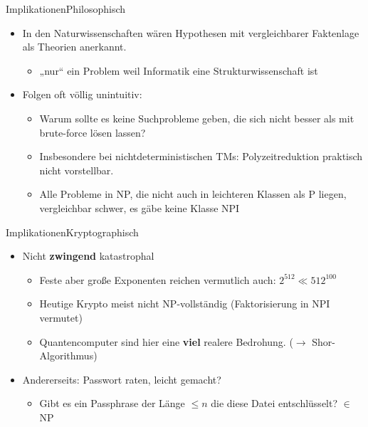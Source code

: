 \documentclass[ignorenonframetext,]{beamer}
\begin{document}
\begin{frame}{Implikationen}{Philosophisch}

\begin{itemize}
\itemsep1pt\parskip0pt
\item
  In den Naturwissenschaften wären Hypothesen mit vergleichbarer
  Faktenlage als Theorien anerkannt.

  \begin{itemize}
  \itemsep1pt\parskip0pt
  \item
    „nur`` ein Problem weil Informatik eine Strukturwissenschaft ist
  \end{itemize}
\item
  Folgen oft völlig unintuitiv:

  \begin{itemize}
  \itemsep1pt\parskip0pt
  \item
    Warum sollte es keine Suchprobleme geben, die sich nicht besser als
    mit brute-force lösen lassen?
  \item
    Insbesondere bei nichtdeterministischen TMs: Polyzeitreduktion
    praktisch nicht vorstellbar.
  \item
    Alle Probleme in NP, die nicht auch in leichteren Klassen als P liegen, vergleichbar
    schwer, es gäbe keine Klasse NPI
  \end{itemize}
\end{itemize}

\end{frame}

\begin{frame}{Implikationen}{Kryptographisch}

\begin{itemize}
\itemsep1pt\parskip0pt
\item
  Nicht \textbf{zwingend} katastrophal

  \begin{itemize}
  \itemsep1pt\parskip0pt
  \item
    Feste aber große Exponenten reichen vermutlich auch:
    $2^{512} \ll 512^{100}$
  \item
    Heutige Krypto meist nicht NP-vollständig (Faktorisierung in NPI
    vermutet)
  \item
    Quantencomputer sind hier eine \textbf{viel} realere Bedrohung.
    ($\rightarrow$ Shor-Algorithmus)
  \end{itemize}
\item
  Andererseits: Passwort raten, leicht gemacht?

  \begin{itemize}
  \itemsep1pt\parskip0pt
  \item
    Gibt es ein Passphrase der Länge $\le n$ die diese Datei
    entschlüsselt? $\in$ NP
  \end{itemize}
\end{itemize}

\end{frame}
\end{document}
